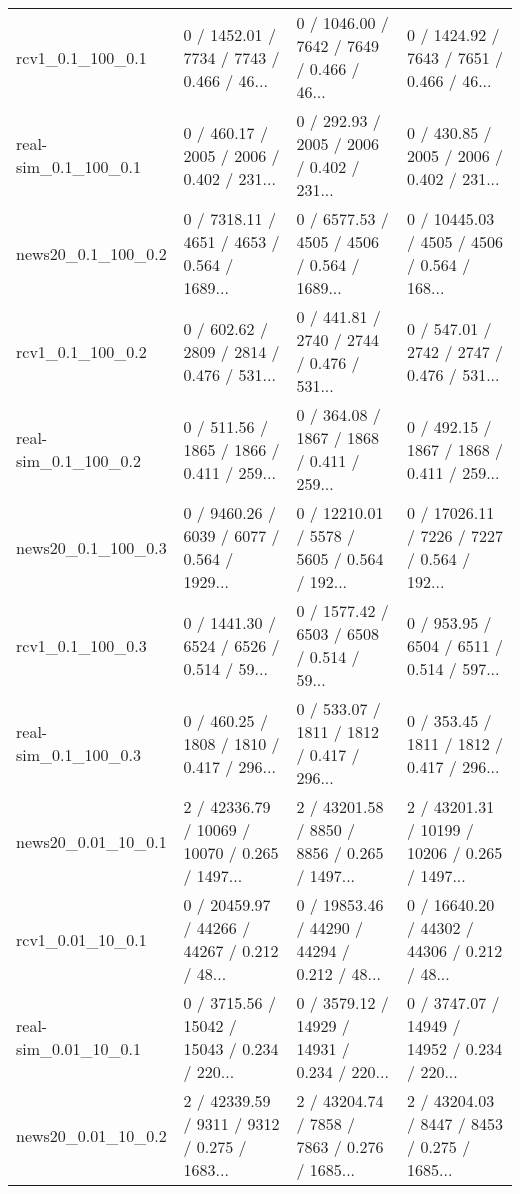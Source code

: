 \begin{tabular}{llll}
          rcv1\_0.1\_100\_0.1 &  0 / 1452.01 /   7734 /    7743 / 0.466 /    46... &  0 / 1046.00 /   7642 /    7649 / 0.466 /    46... &  0 / 1424.92 /   7643 /    7651 / 0.466 /    46... \\
      real-sim\_0.1\_100\_0.1 &  0 / 460.17 /   2005 /    2006 / 0.402 /    231... &  0 / 292.93 /   2005 /    2006 / 0.402 /    231... &  0 / 430.85 /   2005 /    2006 / 0.402 /    231... \\
        news20\_0.1\_100\_0.2 &  0 / 7318.11 /   4651 /    4653 / 0.564 /  1689... &  0 / 6577.53 /   4505 /    4506 / 0.564 /  1689... &  0 / 10445.03 /   4505 /    4506 / 0.564 /  168... \\
          rcv1\_0.1\_100\_0.2 &  0 / 602.62 /   2809 /    2814 / 0.476 /    531... &  0 / 441.81 /   2740 /    2744 / 0.476 /    531... &  0 / 547.01 /   2742 /    2747 / 0.476 /    531... \\
      real-sim\_0.1\_100\_0.2 &  0 / 511.56 /   1865 /    1866 / 0.411 /    259... &  0 / 364.08 /   1867 /    1868 / 0.411 /    259... &  0 / 492.15 /   1867 /    1868 / 0.411 /    259... \\
        news20\_0.1\_100\_0.3 &  0 / 9460.26 /   6039 /    6077 / 0.564 /  1929... &  0 / 12210.01 /   5578 /    5605 / 0.564 /  192... &  0 / 17026.11 /   7226 /    7227 / 0.564 /  192... \\
          rcv1\_0.1\_100\_0.3 &  0 / 1441.30 /   6524 /    6526 / 0.514 /    59... &  0 / 1577.42 /   6503 /    6508 / 0.514 /    59... &  0 / 953.95 /   6504 /    6511 / 0.514 /    597... \\
      real-sim\_0.1\_100\_0.3 &  0 / 460.25 /   1808 /    1810 / 0.417 /    296... &  0 / 533.07 /   1811 /    1812 / 0.417 /    296... &  0 / 353.45 /   1811 /    1812 / 0.417 /    296... \\
        news20\_0.01\_10\_0.1 &  2 / 42336.79 /  10069 /   10070 / 0.265 / 1497... &  2 / 43201.58 /   8850 /    8856 / 0.265 / 1497... &  2 / 43201.31 /  10199 /   10206 / 0.265 / 1497... \\
          rcv1\_0.01\_10\_0.1 &  0 / 20459.97 /  44266 /   44267 / 0.212 /   48... &  0 / 19853.46 /  44290 /   44294 / 0.212 /   48... &  0 / 16640.20 /  44302 /   44306 / 0.212 /   48... \\
      real-sim\_0.01\_10\_0.1 &  0 / 3715.56 /  15042 /   15043 / 0.234 /   220... &  0 / 3579.12 /  14929 /   14931 / 0.234 /   220... &  0 / 3747.07 /  14949 /   14952 / 0.234 /   220... \\
        news20\_0.01\_10\_0.2 &  2 / 42339.59 /   9311 /    9312 / 0.275 / 1683... &  2 / 43204.74 /   7858 /    7863 / 0.276 / 1685... &  2 / 43204.03 /   8447 /    8453 / 0.275 / 1685... \\

\end{tabular}
